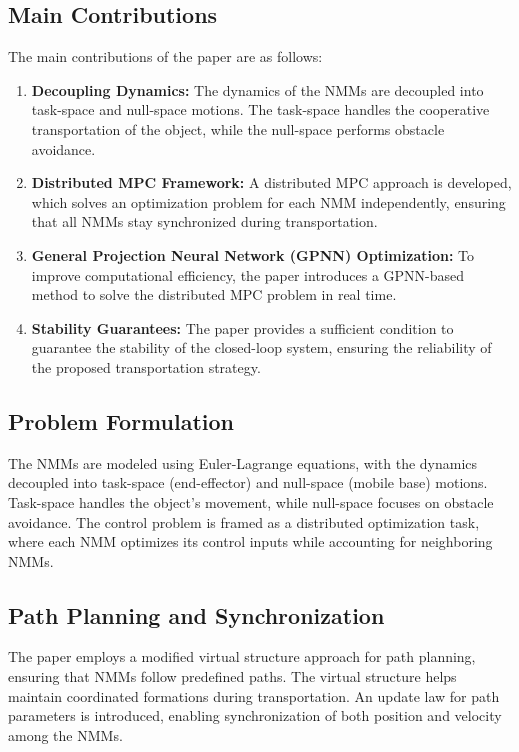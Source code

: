\documentclass[a4paper,12pt]{article}
\begin{document}
        \subsection{Main Contributions}
        The main contributions of the paper are as follows:
        \begin{enumerate}
            \item \textbf{Decoupling Dynamics:} The dynamics of the NMMs are decoupled into task-space and null-space motions. The task-space handles the cooperative transportation of the object, while the null-space performs obstacle avoidance.
            \item \textbf{Distributed MPC Framework:} A distributed MPC approach is developed, which solves an optimization problem for each NMM independently, ensuring that all NMMs stay synchronized during transportation.
            \item \textbf{General Projection Neural Network (GPNN) Optimization:} To improve computational efficiency, the paper introduces a GPNN-based method to solve the distributed MPC problem in real time.
            \item \textbf{Stability Guarantees:} The paper provides a sufficient condition to guarantee the stability of the closed-loop system, ensuring the reliability of the proposed transportation strategy.
        \end{enumerate}
        
        \subsection{Problem Formulation}
        The NMMs are modeled using Euler-Lagrange equations, with the dynamics decoupled into task-space (end-effector) and null-space (mobile base) motions. Task-space handles the object’s movement, while null-space focuses on obstacle avoidance. The control problem is framed as a distributed optimization task, where each NMM optimizes its control inputs while accounting for neighboring NMMs.
        
        \subsection{Path Planning and Synchronization}
        The paper employs a modified virtual structure approach for path planning, ensuring that NMMs follow predefined paths. The virtual structure helps maintain coordinated formations during transportation. An update law for path parameters is introduced, enabling synchronization of both position and velocity among the NMMs. 
        
\end{document}

